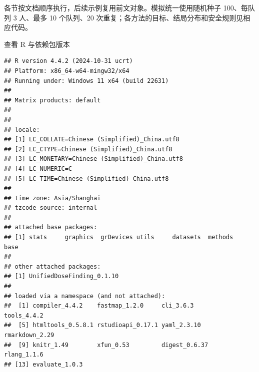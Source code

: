\documentclass[
  chinese,
]{article}
\begin{document}
各节按文档顺序执行，后续示例复用前文对象。模拟统一使用随机种子
100、每队列 3 人、最多 10 个队列、20
次重复；各方法的目标、结局分布和安全规则见相应代码。

查看 R 与依赖包版本

\begin{verbatim}
## R version 4.4.2 (2024-10-31 ucrt)
## Platform: x86_64-w64-mingw32/x64
## Running under: Windows 11 x64 (build 22631)
## 
## Matrix products: default
## 
## 
## locale:
## [1] LC_COLLATE=Chinese (Simplified)_China.utf8 
## [2] LC_CTYPE=Chinese (Simplified)_China.utf8   
## [3] LC_MONETARY=Chinese (Simplified)_China.utf8
## [4] LC_NUMERIC=C                               
## [5] LC_TIME=Chinese (Simplified)_China.utf8    
## 
## time zone: Asia/Shanghai
## tzcode source: internal
## 
## attached base packages:
## [1] stats     graphics  grDevices utils     datasets  methods   base     
## 
## other attached packages:
## [1] UnifiedDoseFinding_0.1.10
## 
## loaded via a namespace (and not attached):
##  [1] compiler_4.4.2    fastmap_1.2.0     cli_3.6.3         tools_4.4.2      
##  [5] htmltools_0.5.8.1 rstudioapi_0.17.1 yaml_2.3.10       rmarkdown_2.29   
##  [9] knitr_1.49        xfun_0.53         digest_0.6.37     rlang_1.1.6      
## [13] evaluate_1.0.3
\end{verbatim}
\end{document}
